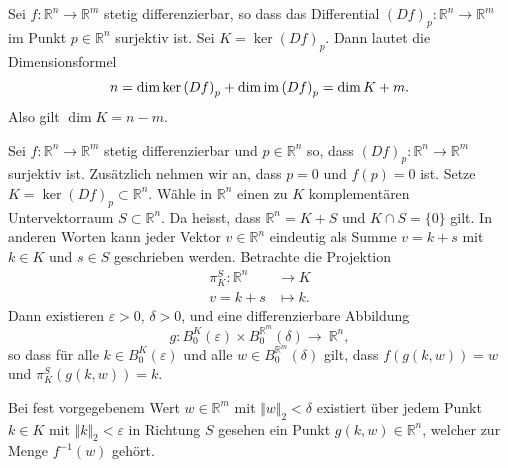 \documentclass[../main.tex]{subfiles}
\begin{document}
Sei $f \colon \mathbb{R}^n \to \mathbb{R}^m$
stetig differenzierbar, so dass das Differential
${(Df)}_p \colon \mathbb{R}^n \to \mathbb{R}^m$
im Punkt $p \in \mathbb{R}^n$ surjektiv ist.
Sei $K = \ker {(Df)}_p$.
Dann lautet die Dimensionsformel
\[
  n = \dim \ker {(Df)}_p + \dim \operatorname{im} {(Df)}_p
  = \dim K + m.
\]
Also gilt $\dim K = n-m$.

\begin{theorem}%
  \label{thm:implicit}
  Sei $f \colon \mathbb{R}^n \to \mathbb{R}^m$ stetig differenzierbar
  und $p \in \mathbb{R}^n$ so, dass ${(Df)}_p \colon \mathbb{R}^n
  \to \mathbb{R}^m$ surjektiv ist.
  Zusätzlich nehmen wir an, dass $p = 0$ und $f(p) = 0$ ist.
  Setze $K = \ker {(Df)}_p \subset \mathbb{R}^n$.
  Wähle in $\mathbb{R}^n$ einen zu $K$ komplementären
  Untervektorraum $S \subset \mathbb{R}^n$.
  Da heisst, dass $\mathbb{R}^n = K + S$ und
  $K \cap S = \{0\}$ gilt.
  In anderen Worten kann jeder Vektor $v \in \mathbb{R}^n$
  eindeutig als Summe $v = k + s$ mit $k \in K$
  und $s \in S$ geschrieben werden.
  Betrachte die Projektion
  \begin{align*}
    \pi_K^S \colon \mathbb{R}^n & \to K \\
     v = k + s & \mapsto k.
  \end{align*}
  Dann existieren $\varepsilon > 0$,
  $\delta > 0$,
  und eine differenzierbare Abbildung
  \[
    g \colon B_0^K (\varepsilon) \times B_0^{\mathbb{R}^m} (\delta)
    \to~\mathbb{R}^n,
  \]
  so dass für alle $k \in B_0^K(\varepsilon)$
  und alle $w \in B_0^{\mathbb{R}^m}(\delta)$
  gilt, dass $f(g(k, w)) = w$
  und $\pi_K^S(g(k, w)) = k$.
\end{theorem}

\begin{geometric}
  Bei fest vorgegebenem Wert $w \in \mathbb{R}^m$
  mit $\Vert w \Vert_2 < \delta$
  existiert über jedem Punkt $k \in K$
  mit $\Vert k \Vert_2 < \varepsilon$
  in Richtung $S$ gesehen ein
  Punkt $g(k, w) \in \mathbb{R}^n$,
  welcher zur Menge $f^{-1}(w)$ gehört.
\end{geometric}
\end{document}
